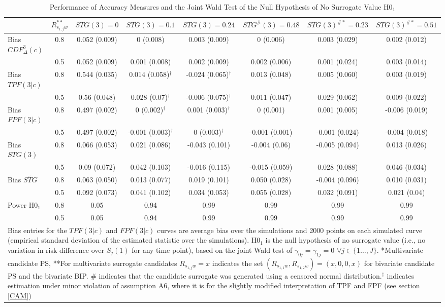 \documentclass[times, doublespace]{simauth}
\begin{document}
\begin{table}
\begin{center}
\caption{Performance of Accuracy Measures and the Joint Wald Test of the Null Hypothesis of No Surrogate Value H0$_1$ \label{Bias}}
\begin{tabular}{lccccccc}
  \hline
&$R_{s_{1,j}w}^{**}$&$STG(3)=0$ & $STG(3)=0.1$  & $STG(3)=0.24$  & $STG^{\#}(3)=0.48$&$STG(3)^{\#*}=0.23$&$STG(3)^{\#*}=0.51$\\ 
  \hline
Bias $CDF^{3}_{\Delta}(c)$& 0.8& 0.052 (0.009) & 0 (0.008) & 0.003 (0.009) & 0 (0.006) & 0.003 (0.029) & 0.002 (0.012) \\ 
 &0.5& 0.052 (0.009) & 0.001 (0.008) & 0.002 (0.009) & 0.002 (0.006) & 0.001 (0.024) & 0.003 (0.014) \\ 
Bias $TPF(3|c)$& 0.8& 0.544 (0.035) & 0.014 (0.058)$^\dagger$ & -0.024 (0.065)$^\dagger$ & 0.013 (0.048) & 0.005 (0.060) & 0.003 (0.019) \\ 
 &0.5& 0.56 (0.048) & 0.028 (0.07)$^\dagger$ & -0.006 (0.075)$^\dagger$ & 0.011 (0.047) & 0.029 (0.062) & 0.009 (0.022) \\ 
Bias $FPF(3|c)$& 0.8& 0.497 (0.002) & 0 (0.002)$^\dagger$ & 0.001 (0.003)$^\dagger$ & 0 (0.001) & 0.001 (0.005) & -0.006 (0.019) \\ 
 &0.5& 0.497 (0.002) & -0.001 (0.003)$^\dagger$ & 0 (0.003)$^\dagger$ & -0.001 (0.001) & -0.001 (0.024) & -0.004 (0.018) \\ 
Bias $STG(3)$& 0.8& 0.066 (0.053) & 0.021 (0.086) & -0.043 (0.101) & -0.004 (0.06) & -0.005 (0.094) & 0.013 (0.026) \\
  &0.5 & 0.09 (0.072) & 0.042 (0.103) & -0.016 (0.115) & -0.015 (0.059) & 0.028 (0.088) & 0.046 (0.034) \\ 
Bias $\widetilde{STG}$ & 0.8 & 0.063 (0.050)& 0.013 (0.077)& 0.019 (0.101)& 0.050 (0.028) & -0.004 (0.096) & 0.010 (0.031) \\
 & 0.5 & 0.092 (0.073) & 0.041 (0.102) & 0.034 (0.053)& 0.055 (0.028)& 0.032 (0.091) & 0.021 (0.04) \\
Power H0$_1$& 0.8& 0.05 & 0.94 & 0.99 & 0.99 & 0.99 & 0.99 \\ 
  &0.5& 0.05 & 0.94 & 0.99 & 0.99 & 0.99 & 0.99 \\ 
   \hline
\multicolumn{8}{p{9in}}{Bias entries for the $TPF(3|c)$ and $FPF(3|c)$ curves are average bias over the simulations and 2000 points on each simulated curve (empirical standard deviation of the estimated statistic over the simulations). H0$_1$ is the null hypothesis of no surrogate value (i.e., no variation in risk difference over $S_j(1)$ for any time point), based on the joint Wald test of $\gamma_{0j}=\gamma_{1j}=0$ $\forall j\in\{1\ldots,J\}$. *Multivariate candidate PS, **For multivariate surrogate candidates $R_{s_{1,j}w}=x$ indicates the set $(R_{s_{1,1}w},R_{s_{1,2}w})=(x,0,0,x)$ for bivariate candidate PS and the bivariate BIP. \# indicates that the candidate surrogate was generated using a censored normal distribution.$^\dagger$ indicates estimation under minor violation of assumption A6, where it is for the slightly modified interpretation of TPF and FPF (see section \ref{CAM})}

\end{tabular}
\end{center}
\end{table}
\end{document}
